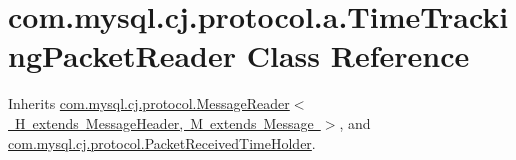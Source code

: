 \hypertarget{classcom_1_1mysql_1_1cj_1_1protocol_1_1a_1_1_time_tracking_packet_reader}{}\section{com.\+mysql.\+cj.\+protocol.\+a.\+Time\+Tracking\+Packet\+Reader Class Reference}
\label{classcom_1_1mysql_1_1cj_1_1protocol_1_1a_1_1_time_tracking_packet_reader}


Inherits \mbox{\hyperlink{interfacecom_1_1mysql_1_1cj_1_1protocol_1_1_message_reader}{com.\+mysql.\+cj.\+protocol.\+Message\+Reader$<$ H extends Message\+Header, M extends Message $>$}}, and \mbox{\hyperlink{interfacecom_1_1mysql_1_1cj_1_1protocol_1_1_packet_received_time_holder}{com.\+mysql.\+cj.\+protocol.\+Packet\+Received\+Time\+Holder}}.

